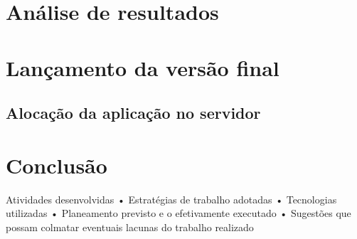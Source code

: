 \documentclass[12pt, twoside]{report}
\begin{document}
	
	
	\chapter{Análise de resultados}
	
	
	
	
	\chapter{Lançamento da versão final}
	
	\section{Alocação da aplicação no servidor}
	
	
	
	\chapter{Conclusão}
	
	Atividades desenvolvidas
	• Estratégias de trabalho adotadas
	• Tecnologias utilizadas
	• Planeamento previsto e o efetivamente executado
	• Sugestões que possam colmatar eventuais lacunas do
	trabalho realizado
	
	
	
	\pagestyle{empty}
	
	
\end{document}
